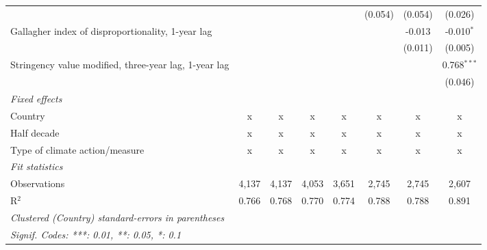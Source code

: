 \begin{table}[htbp]
\begin{tabular}{lccccccc}
                                                            &               &               &              &              & (0.054)       & (0.054)       & (0.026)\\   
      Gallagher index of disproportionality, 1-year lag     &               &               &              &              &               & -0.013        & -0.010$^{*}$\\   
                                                            &               &               &              &              &               & (0.011)       & (0.005)\\   
      Stringency value modified, three-year lag, 1-year lag &               &               &              &              &               &               & 0.768$^{***}$\\   
                                                            &               &               &              &              &               &               & (0.046)\\   
      \emph{Fixed effects}\\
      Country                                               & x             & x             & x            & x            & x             & x             & x\\  
      Half decade                                           & x             & x             & x            & x            & x             & x             & x\\  
      Type of climate action/measure                        & x             & x             & x            & x            & x             & x             & x\\  
      \midrule \emph{Fit statistics}\\
      Observations                                          & 4,137         & 4,137         & 4,053        & 3,651        & 2,745         & 2,745         & 2,607\\  
      R$^2$                                                 & 0.766         & 0.768         & 0.770        & 0.774        & 0.788         & 0.788         & 0.891\\  
      \midrule
      \multicolumn{8}{l}{\emph{Clustered (Country) standard-errors in parentheses}}\\
      \multicolumn{8}{l}{\emph{Signif. Codes: ***: 0.01, **: 0.05, *: 0.1}}\\
   \end{tabular}
\end{table}


